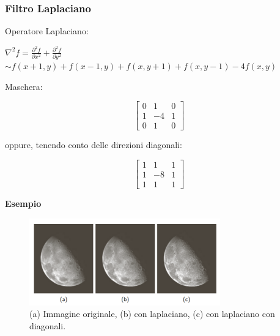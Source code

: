 \subsubsection{Filtro Laplaciano}
Operatore Laplaciano:
\begin{center}
    $\nabla^2 f = \frac{\partial^2{f}}{\partial{x^2}} + \frac{\partial^2{f}}{\partial{y^2}}$
    \\$\sim f(x+1,y)+f(x-1,y)+f(x,y+1)+f(x,y-1)-4f(x,y)$
\end{center}
Maschera:
\begin{center}
    \[
        \begin{bmatrix}
            0 & 1  & 0 \\
            1 & -4 & 1 \\
            0 & 1  & 0
        \end{bmatrix}
    \]
\end{center}
oppure, tenendo conto delle direzioni diagonali:
\begin{center}
    \[
        \begin{bmatrix}
            1 & 1  & 1 \\
            1 & -8 & 1 \\
            1 & 1  & 1
        \end{bmatrix}
    \]
\end{center}
\textbf{Esempio}
\begin{figure}[H]
    \centering
    \includegraphics[width=\linewidth, keepaspectratio]{capitoli/immagini/imgs/laplaciano.png}
    \caption*{(a) Immagine originale, (b) con laplaciano, (c) con laplaciano con
        diagonali.}
\end{figure}

